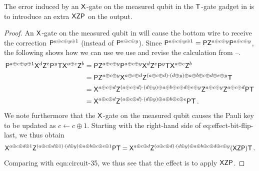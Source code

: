 \documentclass{toc}
\newcommand{\pgate}{{\sf P}}
\newcommand{\tgate}{{\sf T}}
\newcommand{\xgate}{{\sf X}}
\newcommand{\zgate}{{\sf Z}}
\begin{document}
\begin{lemma} \label{lem:error-t-gate}
The error induced by an $\xgate$-gate on the measured qubit in the $\tgate$-gate gadget in  is to  introduce an extra $\xgate \zgate \pgate$ on the output.
\end{lemma}
\begin{proof}
An $\xgate$-gate on the measured qubit in  will cause the bottom wire to receive the correction $\pgate^{a\oplus c \oplus y \oplus 1}$ (instead of $\pgate^{a \oplus c \oplus y}$). Since $\pgate^{a \oplus c \oplus y \oplus 1} =\pgate \zgate^{a \oplus c \oplus y} \pgate^{a \oplus c \oplus y }$,
%
the following shows how we can use 
 we use and revise the calculation from --.%
\begin{align} \label{Eqn:bit-flipstart}
 \pgate^{a \oplus c \oplus y \oplus 1 } \xgate^d  \zgate^e \pgate^y \tgate \xgate^{a\oplus c}\zgate^b
&= \pgate \zgate^{a \oplus c \oplus y} \pgate^{a \oplus c \oplus y } \xgate^d  \zgate^e \pgate^y \tgate \xgate^{a\oplus c}\zgate^b \\
& = \pgate \zgate^{a \oplus c \oplus y} \xgate^{a\oplus c \oplus d}  \zgate^{(a \oplus c \oplus d)\cdot (d \oplus y)   \oplus a \oplus b \oplus c \oplus d \oplus e  \oplus y   } \tgate \\
&= \xgate^{a\oplus c \oplus d}  \zgate^{(a \oplus c \oplus d)\cdot (d \oplus y)   \oplus a \oplus b \oplus c \oplus d \oplus e  \oplus y   } \zgate^{a \oplus c \oplus y} \zgate^{a\oplus c \oplus d}   \pgate \tgate\\ \label{eq:effect-bit-flip-last}
&= \xgate^{a\oplus c \oplus d}  \zgate^{(a \oplus c \oplus d)\cdot (d \oplus y)   \oplus a \oplus b \oplus c \oplus e }  \pgate \tgate\,. %
\end{align}
We note furthermore that the $\xgate$-gate on the measured qubit causes the Pauli key to be updated as $c\leftarrow c \oplus 1$. Starting with the right-hand side of
 {eq:effect-bit-flip-last}, we thus obtain%
\begin{equation}\label{Eqn:bit-flipend}
\xgate^{a\oplus c \oplus d \oplus 1}  \zgate^{(a \oplus c \oplus d \oplus 1)\cdot (d \oplus y)   \oplus a \oplus b \oplus c \oplus e \oplus 1 }  \pgate \tgate
= \xgate^{a\oplus c \oplus d }  \zgate^{(a \oplus c \oplus d )\cdot (d \oplus y)   \oplus a \oplus b \oplus c \oplus d \oplus e \oplus y} (\xgate \zgate \pgate) \tgate\,.
\end{equation}
Comparing with  {eqn:circuit-35}, we thus see that the effect is to apply  $\xgate \zgate \pgate$.
\end{proof}
\end{document}
